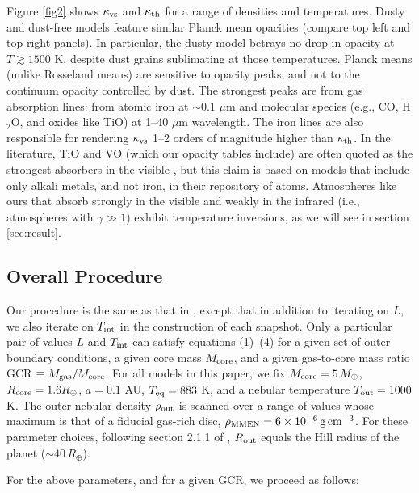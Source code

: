 \documentclass[fleqn,useAMS,usenatbib]{mnras}
\begin{document}
Figure \ref{fig2} shows $\kappa_{\rm vs}$ and $\kappa_{\rm th}$
for a range of densities and temperatures.
Dusty and dust-free models feature similar Planck mean opacities
(compare top left and top right panels). In particular,
the dusty model betrays no drop in opacity at $T \gtrsim 1500$ K,
despite dust grains sublimating at those temperatures.
Planck means (unlike Rosseland means) are sensitive to opacity
peaks, and not to the continuum opacity controlled by dust.
The strongest peaks are from gas absorption lines: from atomic
iron at $\sim$0.1 $\mu$m and molecular species (e.g., CO, H$_2$O,
and oxides like TiO) at 1--40 $\mu$m wavelength.
The iron lines are also responsible for rendering $\kappa_{\rm vs}$
1--2 orders of magnitude higher than $\kappa_{\rm th}$.
In the literature, TiO and VO (which our opacity tables
include) are often quoted as the 
strongest absorbers in the visible 
\citep[e.g.,][]{hubeny03}, but this claim is based on models
that include only alkali metals, and not iron, in their repository of
atoms. Atmospheres like ours that absorb strongly in the visible and
weakly in the infrared (i.e., atmospheres with $\gamma \gg 1$)
exhibit temperature inversions, as we will see in section \ref{sec:result}.

\subsection{Overall Procedure}
\label{ssec:procedure}
Our procedure is the same as that in \citet{paper1}, except that in addition
to iterating on $L$, we also iterate on $T_{\rm int}$
in the construction of each snapshot. Only a
particular pair of values $L$ and $T_{\rm int}$ can satisfy
equations (1)--(4) for a given set of outer boundary conditions,
a given core mass $M_{\rm core}$,
and a given gas-to-core mass ratio
GCR $\equiv M_{\rm gas}/M_{\rm core}$.
For all models in this paper, we fix $M_{\rm core} = 5\, M_\oplus$,
$R_{\rm core} = 1.6 R_\oplus$,
$a = 0.1$ AU, $T_{\rm eq} = 883$ K,
and a nebular temperature $T_{\rm out} = 1000$ K.
The outer nebular density $\rho_{\rm out}$ is scanned over
a range of values whose maximum is that of a fiducial gas-rich
disc, $\rho_{\rm MMEN} = 6 \times 10^{-6}\,{\rm g\,cm^{-3}}$.
For these parameter choices, following section 2.1.1 of
\citet{paper1}, $R_{\rm out}$ equals the Hill radius of the planet
($\sim$$40\,R_\oplus$).

For the above parameters, and for a given GCR, we proceed as follows:
\end{document}

